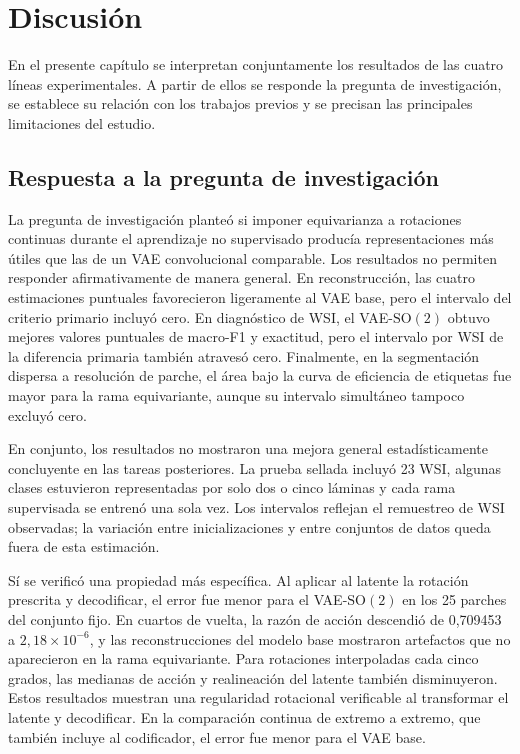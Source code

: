 \chapter{Discusión}

En el presente capítulo se interpretan conjuntamente los resultados de las
cuatro líneas experimentales. A partir de ellos se responde la pregunta de
investigación, se establece su relación con los trabajos previos y se precisan
las principales limitaciones del estudio.

\section{Respuesta a la pregunta de investigación}

La pregunta de investigación planteó si imponer equivarianza a rotaciones
continuas durante el aprendizaje no supervisado producía representaciones más
útiles que las de un VAE convolucional comparable. Los resultados no permiten
responder afirmativamente de manera general. En reconstrucción, las cuatro
estimaciones puntuales favorecieron ligeramente al VAE base, pero el intervalo del
criterio primario incluyó cero. En diagnóstico de WSI, el
VAE-\(\mathrm{SO}(2)\) obtuvo mejores valores puntuales de macro-F1 y exactitud,
pero el
intervalo por WSI de la diferencia primaria también atravesó cero. Finalmente,
en la segmentación dispersa a resolución de parche, el área bajo la curva de
eficiencia de etiquetas fue mayor para la rama equivariante, aunque su
intervalo simultáneo tampoco excluyó cero.

En conjunto, los resultados no mostraron una mejora general estadísticamente
concluyente en las tareas posteriores. La
prueba sellada incluyó 23 WSI, algunas clases estuvieron representadas por solo
dos o cinco láminas y cada rama supervisada se entrenó una sola vez. Los
intervalos reflejan el remuestreo de WSI observadas; la variación entre
inicializaciones y entre conjuntos de datos queda fuera de esta estimación.

Sí se verificó una propiedad más específica. Al aplicar al latente la rotación
prescrita y decodificar, el error fue menor para el VAE-\(\mathrm{SO}(2)\) en
los 25 parches del conjunto fijo. En cuartos de vuelta, la razón de acción
descendió de 0,709453 a \(2,18\times10^{-6}\), y las reconstrucciones del
modelo base mostraron artefactos que no aparecieron en la rama equivariante.
Para rotaciones interpoladas cada cinco grados, las medianas de acción y
realineación del latente también disminuyeron. Estos resultados muestran una regularidad rotacional verificable
al transformar el latente y decodificar. En la comparación continua de extremo
a extremo, que también incluye al codificador, el error fue menor para el VAE
base.

